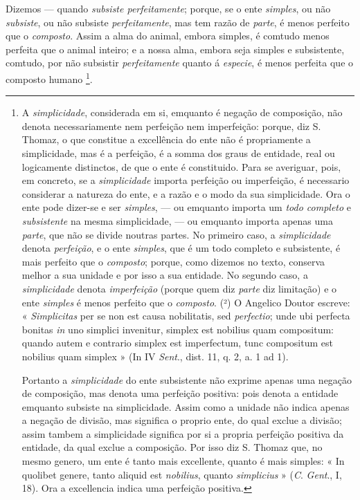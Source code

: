 Dizemos --- quando \emph{subsiste perfeitamente}; porque, se o ente \emph{simples}, ou não \emph{subsiste}, ou não subsiste \emph{perfeitamente}, mas tem razão de \emph{parte}, é menos perfeito que o \emph{composto}. Assim a alma do animal, embora simples, é comtudo menos perfeita que o animal inteiro; e a nossa alma, embora seja simples e subsistente, comtudo, por não subsistir \emph{perfeitamente} quanto á \emph{especie}, é menos perfeita que o composto humano \footnote{A \emph{simplicidade}, considerada em si, emquanto é negação de composição, não denota necessariamente nem perfeição nem imperfeição: porque, diz S. Thomaz, o que constitue a excellência do ente não é propriamente a simplicidade, mas é a perfeição, é a somma dos graus de entidade, real ou logicamente distinctos, de que o ente é constituido. Para se averiguar, pois, em concreto, se a \emph{simplicidade} importa perfeição ou imperfeição, é necessario considerar a natureza do ente, e a razão e o modo da sua simplicidade. Ora o ente pode dizer-se e ser \emph{simples}, --- ou emquanto importa um \emph{todo completo} e \emph{subsistente} na mesma simplicidade, --- ou emquanto importa apenas uma \emph{parte}, que não se divide noutras partes. No primeiro caso, a \emph{simplicidade} denota \emph{perfeição}, e o ente \emph{simples}, que é um todo completo e subsistente, é mais perfeito que o \emph{composto}; porque, como dizemos no texto, conserva melhor a sua unidade e por isso a sua entidade. No segundo caso, a \emph{simplicidade} denota \emph{imperfeição} (porque quem diz \emph{parte} diz limitação) e o ente \emph{simples} é menos perfeito que o \emph{composto}. (²) O Angelico Doutor escreve: « \emph{Simplicitas} per se non est causa nobilitatis, sed \emph{perfectio}; unde ubi perfecta bonitas \emph{in} uno simplici invenitur, simplex est nobilius quam compositum: quando autem e contrario simplex est imperfectum, tunc compositum est nobilius quam simplex » (In IV \emph{Sent}., dist. 11, q. 2, a. 1 ad 1).\par Portanto a \emph{simplicidade} do ente subsistente não exprime apenas uma negação de composição, mas denota uma perfeição positiva: pois denota a entidade emquanto subsiste na simplicidade. Assim como a unidade não indica apenas a negação de divisão, mas significa o proprio ente, do qual exclue a divisão; assim tambem a simplicidade significa por si a propria perfeição positiva da entidade, da qual exclue a composição. Por isso diz S. Thomaz que, no mesmo genero, um ente é tanto mais excellente, quanto é mais simples: « In quolibet genere, tanto aliquid est \emph{nobilius}, quanto \emph{simplicius} » (\emph{C}. \emph{Gent}., I, 18). Ora a excellencia indica uma perfeição positiva.}.

